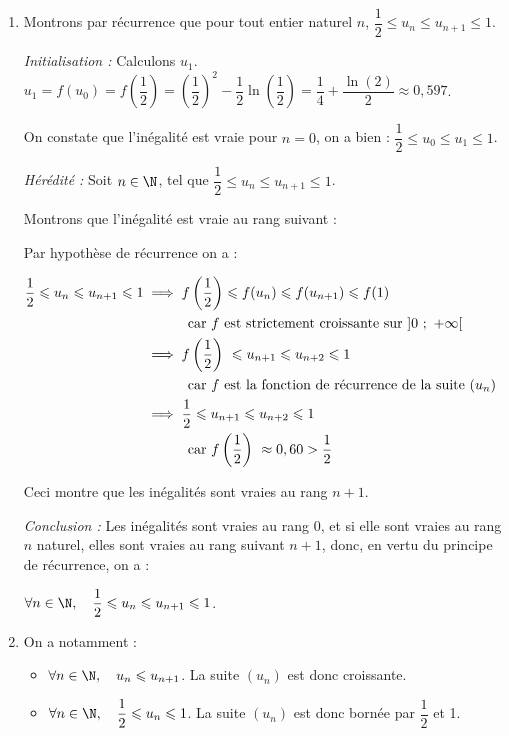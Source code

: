 \begin{enumerate}
	\item Montrons par récurrence que pour tout entier naturel  $n$, \quad$\dfrac{1}{2} \leqslant u_n \leqslant u_{n+1} \leqslant 1$.



\emph{Initialisation :} Calculons $u_1$. $u_1 = f(u_0) = f\left(\dfrac{1}{2} \right) = \left(\dfrac{1}{2}\right)^2-\dfrac{1}{2}\ln \left(\dfrac{1}{2}\right)= \dfrac{1}{4} +\dfrac{\ln(2)}{2}\approx 0,597 $.

On constate que l'inégalité est vraie pour $n = 0$, on a bien : \quad $ \dfrac{1}{2}\leqslant u_0 \leqslant u_1 \leqslant 1$.

\smallskip

\emph{Hérédité :} Soit $n \in \N$, tel que \quad $ \dfrac{1}{2}\leqslant u_n \leqslant u_{n+1} \leqslant 1$.

Montrons que l'inégalité est vraie au rang suivant :

Par hypothèse de récurrence on a :

$ \aligned[t] \dfrac{1}{2}\leqslant u_n \leqslant u_{n+1} \leqslant 1
&\implies f\left(\dfrac{1}{2}\right)\leqslant f(u_n) \leqslant f(u_{n+1}) \leqslant f(1)\\
&\hphantom{\implies}\quad \text{car $f$ est strictement croissante sur }]0~;~+\infty[\\
&\implies f\left(\dfrac{1}{2}\right)\ \leqslant u_{n+1 } \leqslant u_{n+2} \leqslant 1\\
&\hphantom{\implies}\quad \text{car $f$ est la fonction de récurrence de la suite } (u_n)\\
&\implies \dfrac{1}{2} \leqslant u_{n+1 } \leqslant u_{n+2} \leqslant 1\\
&\hphantom{\implies}\quad \text{car } f\left(\dfrac{1}{2}\right)\ \approx 0,60 >\dfrac{1}{2} \\\endaligned$

Ceci montre que les  inégalités sont vraies au rang $n + 1$.

\smallskip

\emph{Conclusion :} Les inégalités sont vraies au rang 0, et si elle sont vraies au rang $n$ naturel, elles sont vraies au rang suivant $n + 1$, donc, en vertu du principe de récurrence, on a :

$\forall n \in \N,\quad \dfrac{1}{2} \leqslant u_{n} \leqslant u_{n+1} \leqslant 1$.

	\item On a notamment :
		\begin{itemize}
			\item $\forall n \in \N,\quad u_{n} \leqslant u_{n+1}$. \quad La suite $(u_n)$ est donc  croissante.
			\item $\forall n \in \N,\quad \dfrac{1}{2} \leqslant u_{n}\leqslant 1$. \quad La suite $\left(u_n\right)$ est donc bornée par $\dfrac{1}{2}$ et 1.
		\end{itemize}


\end{enumerate}
